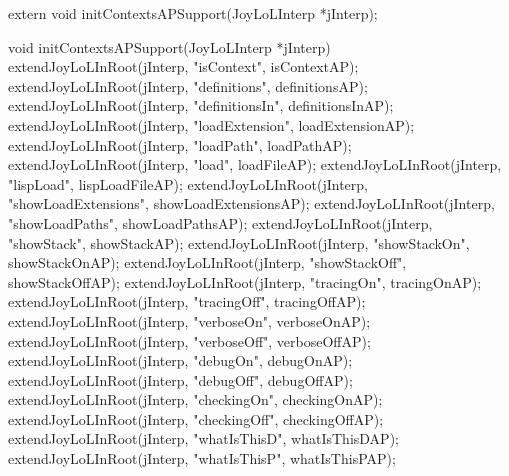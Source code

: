\startCHeader
extern void initContextsAPSupport(JoyLoLInterp *jInterp);
\stopCHeader
{}

\startCCode
void initContextsAPSupport(JoyLoLInterp *jInterp) {
  extendJoyLoLInRoot(jInterp, "isContext",           isContextAP);
  extendJoyLoLInRoot(jInterp, "definitions",         definitionsAP);
  extendJoyLoLInRoot(jInterp, "definitionsIn",       definitionsInAP);
  extendJoyLoLInRoot(jInterp, "loadExtension",       loadExtensionAP);
  extendJoyLoLInRoot(jInterp, "loadPath",            loadPathAP);
  extendJoyLoLInRoot(jInterp, "load",                loadFileAP);
  extendJoyLoLInRoot(jInterp, "lispLoad",            lispLoadFileAP);
  extendJoyLoLInRoot(jInterp, "showLoadExtensions",  showLoadExtensionsAP);
  extendJoyLoLInRoot(jInterp, "showLoadPaths",       showLoadPathsAP);
  extendJoyLoLInRoot(jInterp, "showStack",           showStackAP);
  extendJoyLoLInRoot(jInterp, "showStackOn",         showStackOnAP);
  extendJoyLoLInRoot(jInterp, "showStackOff",        showStackOffAP);
  extendJoyLoLInRoot(jInterp, "tracingOn",           tracingOnAP);
  extendJoyLoLInRoot(jInterp, "tracingOff",          tracingOffAP);
  extendJoyLoLInRoot(jInterp, "verboseOn",           verboseOnAP);
  extendJoyLoLInRoot(jInterp, "verboseOff",          verboseOffAP);
  extendJoyLoLInRoot(jInterp, "debugOn",             debugOnAP);
  extendJoyLoLInRoot(jInterp, "debugOff",            debugOffAP);
  extendJoyLoLInRoot(jInterp, "checkingOn",          checkingOnAP);
  extendJoyLoLInRoot(jInterp, "checkingOff",         checkingOffAP);
  extendJoyLoLInRoot(jInterp, "whatIsThisD",         whatIsThisDAP);
  extendJoyLoLInRoot(jInterp, "whatIsThisP",         whatIsThisPAP);
}
\stopCCode